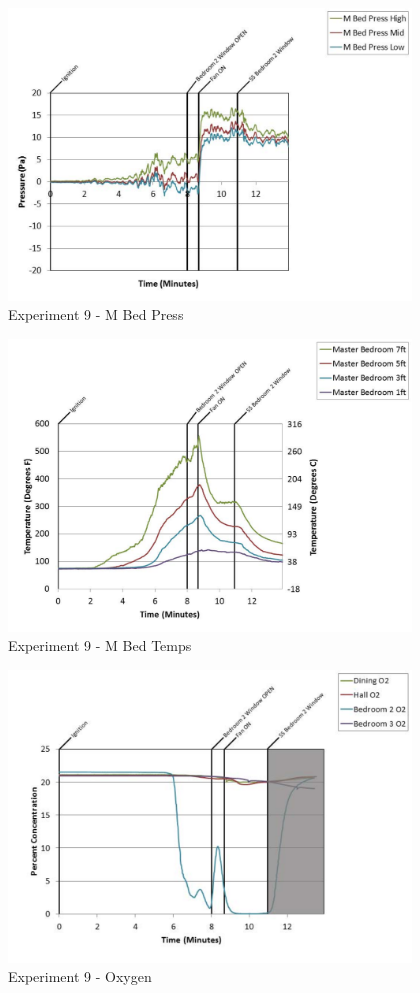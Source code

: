 \documentclass{article}
\begin{document}
\begin{appendices}
	\clearpage

	\begin{figure}[h!]
		\centering
		\includegraphics[height=3.05in]{0_Images/Results_Charts/Exp_9_Charts/MBedPress.pdf}
		\caption{Experiment 9 - M Bed Press}
	\end{figure}
 

	\begin{figure}[h!]
		\centering
		\includegraphics[height=3.05in]{0_Images/Results_Charts/Exp_9_Charts/MBedTemps.pdf}
		\caption{Experiment 9 - M Bed Temps}
	\end{figure}
 
	\clearpage

	\begin{figure}[h!]
		\centering
		\includegraphics[height=3.05in]{0_Images/Results_Charts/Exp_9_Charts/Oxygen.pdf}
		\caption{Experiment 9 - Oxygen}
	\end{figure}
 


\end{appendices}
\end{document}
